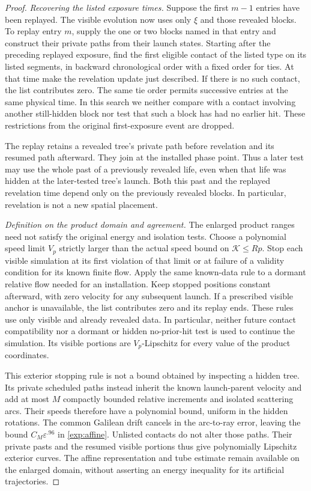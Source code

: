 \begin{proof}
\emph{Recovering the listed exposure times.}
Suppose the first $m-1$ entries have been replayed.  The visible evolution
now uses only $\xi$ and those revealed blocks.  To replay entry $m$, supply
the one or two blocks named in that entry and construct their private
paths from their launch states.  Starting after the preceding replayed
exposure, find the first eligible contact of the listed type on its listed
segments, in backward chronological order with a fixed order for ties.
At that time make the revelation
update just described.  If there is no such contact, the list contributes
zero.  The same tie order permits successive entries at the same physical
time.  In this search we neither compare with a contact involving another
still-hidden block nor test that such a block has had no earlier hit.
These restrictions from the original first-exposure event are dropped.

The replay retains a revealed tree's private path before revelation and
its resumed path afterward.  They join at the installed phase point.
Thus a later test may use the whole past of a previously revealed life,
even when that life was hidden at the later-tested tree's launch.  Both
this past and the replayed revelation time depend only on the previously
revealed blocks.  In particular, revelation is not a new spatial placement.

\emph{Definition on the product domain and agreement.}
The enlarged product ranges need not satisfy the original energy and
isolation tests.  Choose a polynomial speed limit $V_p$ strictly larger
than the actual speed bound on $\mathcal K\le Rp$.  Stop each visible
simulation at its first violation of that limit or at failure of a validity
condition for its known finite flow.  Apply the same known-data rule to a
dormant relative flow needed for an installation.  Keep stopped positions
constant afterward, with zero velocity for any subsequent launch.  If a
prescribed visible anchor is unavailable, the list contributes zero and
its replay ends.  These rules use only visible
and already revealed data.  In particular, neither future contact
compatibility nor a dormant or hidden no-prior-hit test is used to continue
the simulation.  Its visible portions are $V_p$-Lipschitz for every value
of the product coordinates.

This exterior stopping rule is not a bound obtained by inspecting a hidden
tree.  Its private scheduled paths instead inherit the known launch-parent
velocity and add at most $M$ compactly bounded relative increments and
isolated scattering arcs.  Their speeds therefore have a polynomial bound,
uniform in the hidden rotations.  The common Galilean drift cancels in the
arc-to-ray error, leaving the bound $C_M\varepsilon^{.96}$ in
\eqref{exp:affine}.  Unlisted contacts do not alter those paths.  Their
private pasts and the resumed visible portions thus give polynomially
Lipschitz exterior curves.  The affine representation and tube estimate remain
available on the enlarged domain, without asserting an energy inequality
for its artificial trajectories.


\end{proof}
